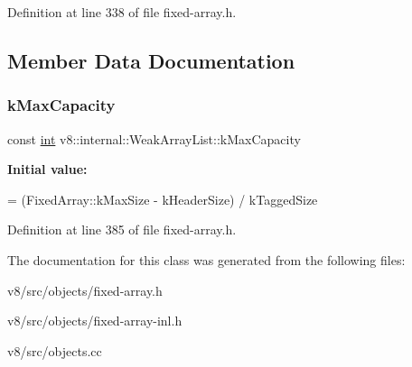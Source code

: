 Definition at line 338 of file fixed-\/array.\+h.



\subsection{Member Data Documentation}
\mbox{\label{classv8_1_1internal_1_1WeakArrayList_af5feacfbcc69aeff03a7507c16c26d10}} 
\subsubsection{\texorpdfstring{k\+Max\+Capacity}{kMaxCapacity}}
{\footnotesize\ttfamily const \mbox{\hyperlink{classint}{int}} v8\+::internal\+::\+Weak\+Array\+List\+::k\+Max\+Capacity\hspace{0.3cm}{\ttfamily [static]}}

{\bfseries Initial value\+:}
\begin{DoxyCode}
=
      (FixedArray::kMaxSize - kHeaderSize) / kTaggedSize
\end{DoxyCode}


Definition at line 385 of file fixed-\/array.\+h.



The documentation for this class was generated from the following files\+:\begin{DoxyCompactItemize}
\item 
v8/src/objects/fixed-\/array.\+h\item 
v8/src/objects/fixed-\/array-\/inl.\+h\item 
v8/src/objects.\+cc\end{DoxyCompactItemize}
